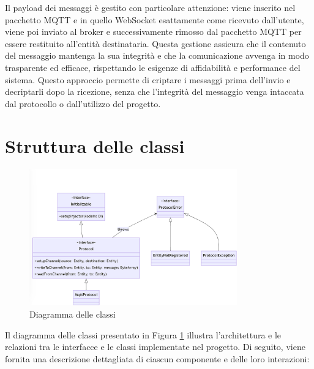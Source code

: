 \documentclass[12pt,a4paper,openright,twoside]{book}
\begin{document}
Il payload dei messaggi è gestito con particolare attenzione: viene inserito nel pacchetto \ac{MQTT} e in quello WebSocket esattamente come ricevuto dall'utente, viene poi inviato al broker e successivamente 
rimosso dal pacchetto \ac{MQTT} per essere restituito all'entità destinataria. Questa gestione assicura che il contenuto del messaggio mantenga la sua integrità e che la comunicazione avvenga in modo trasparente ed efficace, 
rispettando le esigenze di affidabilità e performance del sistema. Questo approccio permette di criptare i messaggi prima dell'invio e decriptarli dopo la ricezione, senza che l'integrità del messaggio venga intaccata dal 
protocollo o dall'utilizzo del progetto.

\section{Struttura delle classi}

\begin{figure}[H]
    \centering
    \includegraphics[width=0.8\textwidth]{figures/class-diagram.png}
    \caption{Diagramma delle classi}
    \label{fig:class-diagram}
\end{figure}

Il diagramma delle classi presentato in Figura \ref{fig:class-diagram} illustra l'architettura e le relazioni tra le interfacce e le classi implementate nel progetto. 
Di seguito, viene fornita una descrizione dettagliata di ciascun componente e delle loro interazioni:
\end{document}
